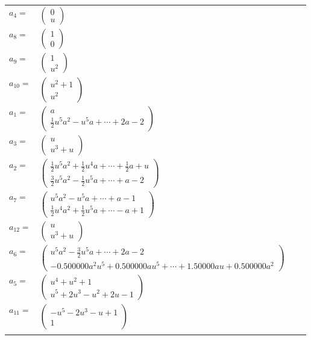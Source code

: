 \documentclass[1p]{elsarticle_modified}
\theoremstyle{definition}
\begin{document}
\begin{tabular}{m{7pt} m{180pt} m{7pt} m{180pt} }
\flushright $a_{4}=$&$\begin{pmatrix}0\\u\end{pmatrix}$ \\
\flushright $a_{8}=$&$\begin{pmatrix}1\\0\end{pmatrix}$ \\
\flushright $a_{9}=$&$\begin{pmatrix}1\\u^2\end{pmatrix}$ \\
\flushright $a_{10}=$&$\begin{pmatrix}u^2+1\\u^2\end{pmatrix}$ \\
\flushright $a_{1}=$&$\begin{pmatrix}a\\\frac{1}{2} u^5 a^2- u^5 a+\cdots+2 a-2\end{pmatrix}$ \\
\flushright $a_{3}=$&$\begin{pmatrix}u\\u^3+u\end{pmatrix}$ \\
\flushright $a_{2}=$&$\begin{pmatrix}\frac{1}{2} u^5 a^2+\frac{1}{2} u^4 a+\cdots+\frac{1}{2} a+u\\\frac{3}{2} u^5 a^2-\frac{1}{2} u^5 a+\cdots+a-2\end{pmatrix}$ \\
\flushright $a_{7}=$&$\begin{pmatrix}u^5 a^2- u^5 a+\cdots+a-1\\\frac{1}{2} u^4 a^2+\frac{1}{2} u^5 a+\cdots- a+1\end{pmatrix}$ \\
\flushright $a_{12}=$&$\begin{pmatrix}u\\u^3+u\end{pmatrix}$ \\
\flushright $a_{6}=$&$\begin{pmatrix}u^5 a^2-\frac{3}{2} u^5 a+\cdots+2 a-2\\-0.500000 a^{2} u^{5}+0.500000 a u^{5}+\cdots+1.50000 a u+0.500000 a^{2}\end{pmatrix}$ \\
\flushright $a_{5}=$&$\begin{pmatrix}u^4+u^2+1\\u^5+2 u^3- u^2+2 u-1\end{pmatrix}$ \\
\flushright $a_{11}=$&$\begin{pmatrix}- u^5-2 u^3- u+1\\1\end{pmatrix}$\\&\end{tabular}
\end{document}
